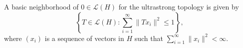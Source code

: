 \begin{proposition}
A basic neighborhood of $0 \in \mathcal{L}(H)$ for the ultrastrong topology is given by
$$\left\{T \in \mathcal{L}(H): \sum_{i=1}^{\infty} \| Tx_i \|^2 \leq 1\right\},$$
where $(x_i)$ is a sequence of vectors in $H$ such that $\sum_{i=1}^{\infty} \| x_i \|^2 < \infty$.
\end{proposition}
